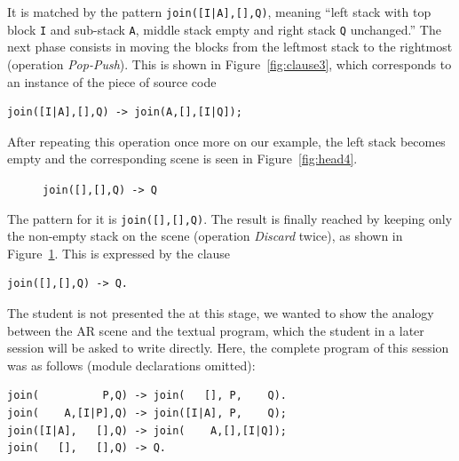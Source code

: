 It is matched by the pattern \texttt{join([I|A],[],Q)}, meaning ``left
stack with top block \texttt{I} and sub\hyp{}stack \texttt{A}, middle
stack empty and right stack \texttt{Q} unchanged.'' The next phase
consists in moving the blocks from the leftmost stack to the rightmost
(operation \textsl{Pop\hyp{}Push}). This is shown in
Figure~\ref{fig:clause3}, which corresponds to an instance of the
piece of source code 
{\small
\begin{verbatim}
join([I|A],[],Q) -> join(A,[],[I|Q]);
\end{verbatim}
}
\noindent After repeating this operation once more on our example, the
left stack becomes empty and the corresponding scene is seen in
Figure~\ref{fig:head4}. 
\begin{figure}[!h]
\centering
{}
\quad
{}
\caption{\texttt{\small join([],[],Q) -> Q}}
\label{fig:clause4}
\end{figure}
The \erlang pattern for it is \texttt{join([],[],Q)}. The result is
finally reached by keeping only the non\hyp{}empty stack on the scene
(operation \textsl{Discard} twice), as shown in
Figure~\ref{fig:clause4}. This is expressed by the clause
{\small
\begin{verbatim}
join([],[],Q) -> Q.
\end{verbatim}
} 
The student is not presented the \erlang at this stage, we wanted to
show the analogy between the AR scene and the textual program, which
the student in a later session will be asked to write directly. Here,
the complete \erlang program of this session was as follows (module
declarations omitted):
{\small
\begin{verbatim}
join(          P,Q) -> join(   [], P,    Q).
join(    A,[I|P],Q) -> join([I|A], P,    Q);
join([I|A],   [],Q) -> join(    A,[],[I|Q]);
join(   [],   [],Q) -> Q.
\end{verbatim}
}


